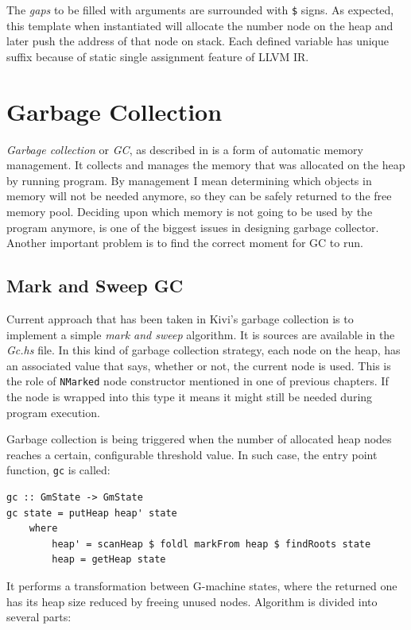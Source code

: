 \documentclass[12pt,a4paper]{report}
\begin{document}
The \textit{gaps} to be filled with arguments are surrounded with \texttt{\$}
signs. As expected, this template when instantiated will allocate the number
node on the heap and later push the address of that node on stack. Each defined
variable has unique suffix because of static single assignment feature of LLVM
IR.


\section{Garbage Collection}
\label{sec:garbage_collection}
\textit{Garbage collection} or \textit{GC}, as described in
\cite{wiki:garbage_collection} is a form of automatic memory management. It
collects and manages the memory that was allocated on the heap by running
program. By management I mean determining which objects in memory will not be
needed anymore, so they can be safely returned to the free memory pool.
Deciding upon which memory is not going to be used by the program anymore, is
one of the biggest issues in designing garbage collector. Another important
problem is to find the correct moment for GC to run.

\subsection{Mark and Sweep GC}
Current approach that has been taken in Kivi's garbage collection is to
implement a simple \textit{mark and sweep} algorithm. It is sources are
available in the \textit{Gc.hs} file. In this kind of garbage collection
strategy, each node on the heap, has an associated value that says, whether or
not, the current node is used. This is the role of \texttt{NMarked} node
constructor mentioned in one of previous chapters. If the node is wrapped into
this type it means it might still be needed during program execution.

Garbage collection is being triggered when the number of allocated heap nodes
reaches a certain, configurable threshold value. In such case, the entry point
function, \texttt{gc} is called:

\vspace*{0.2in}
\begin{lstlisting}[style=haskell]
gc :: GmState -> GmState
gc state = putHeap heap' state
    where
        heap' = scanHeap $ foldl markFrom heap $ findRoots state
        heap = getHeap state
\end{lstlisting}

It performs a transformation between G-machine states, where the returned one
has its heap size reduced by freeing unused nodes. Algorithm is divided into
several parts:
\end{document}
